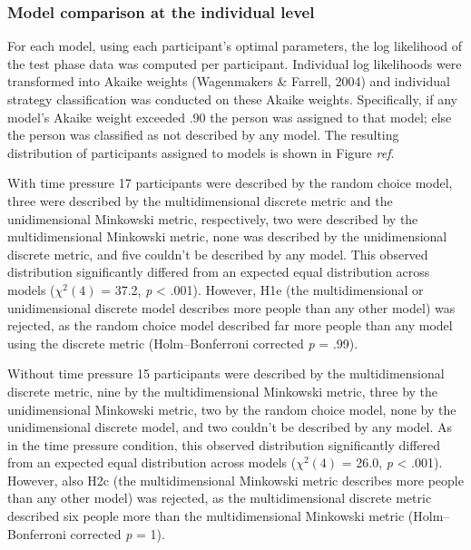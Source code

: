 \documentclass[a4paper,man,natbib]{apa6}
\begin{document}
\subsubsection{Model comparison at the individual level}
For each model, using each participant's optimal parameters, the log likelihood of the test phase data was computed per participant. Individual log likelihoods were transformed into Akaike weights (Wagenmakers \& Farrell, 2004) and individual strategy classification was conducted on these Akaike weights. Specifically, if any model’s Akaike weight exceeded .90 the person was assigned to that model; else the person was classified as not described by any model. The resulting distribution of participants assigned to models is shown in Figure \textit{ref}.

With time pressure 17 participants were described by the random choice model, three were described by the multidimensional discrete metric and the unidimensional Minkowski metric, respectively, two were described by the multidimensional Minkowski metric, none was described by the unidimensional discrete metric, and five couldn't be described by any model. This observed distribution significantly differed from an expected equal distribution across models ($\chi^{2}(4)$ = 37.2, \textit{p} < .001). However, H1e (the multidimensional or unidimensional discrete model describes more people than any other model) was rejected, as the random choice model described far more people than any model using the discrete metric (Holm--Bonferroni corrected \textit{p} = .99). 

Without time pressure 15 participants were described by the multidimensional discrete metric, nine by the multidimensional Minkowski metric, three by the unidimensional Minkowski metric, two by the random choice model, none by the unidimensional discrete model, and two couldn't be described by any model. As in the time pressure condition, this observed distribution significantly differed from an expected equal distribution across models ($\chi^{2}(4)$ = 26.0, \textit{p} < .001). However, also H2c (the multidimensional Minkowski metric describes more people than any other model) was rejected, as the multidimensional discrete metric described six people more than the multidimensional Minkowski metric (Holm--Bonferroni corrected \textit{p} = 1).
\end{document}

